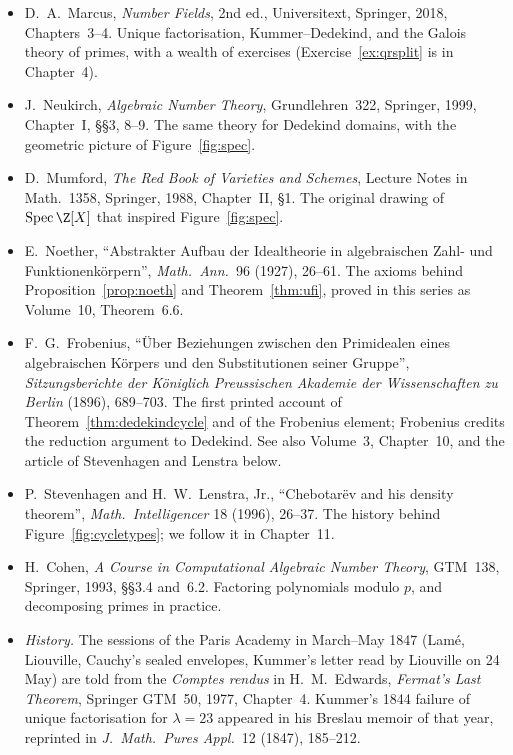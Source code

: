 \begin{itemize}
\item D.~A.~Marcus, \emph{Number Fields}, 2nd ed., Universitext, Springer, 2018, Chapters~3--4. Unique factorisation,
Kummer--Dedekind, and the Galois theory of primes, with a wealth of exercises (Exercise~\ref{ex:qrsplit} is in Chapter~4).
\item J.~Neukirch, \emph{Algebraic Number Theory}, Grundlehren~322, Springer, 1999, Chapter~I, \S\S3, 8--9. The same
theory for Dedekind domains, with the geometric picture of Figure~\ref{fig:spec}.
\item D.~Mumford, \emph{The Red Book of Varieties and Schemes}, Lecture Notes in Math.~1358, Springer, 1988, Chapter~II,
\S1. The original drawing of $\operatorname{Spec}\Z[X]$ that inspired Figure~\ref{fig:spec}.
\item E.~Noether, ``Abstrakter Aufbau der Idealtheorie in algebraischen Zahl- und Funktionenk\"orpern'',
\emph{Math.\ Ann.}\ 96 (1927), 26--61. The axioms behind Proposition~\ref{prop:noeth} and Theorem~\ref{thm:ufi}, proved
in this series as Volume~10, Theorem~6.6.
\item F.~G.~Frobenius, ``\"Uber Beziehungen zwischen den Primidealen eines algebraischen K\"orpers und den Substitutionen
seiner Gruppe'', \emph{Sitzungsberichte der K\"oniglich Preussischen Akademie der Wissenschaften zu Berlin} (1896),
689--703. The first printed account of Theorem~\ref{thm:dedekindcycle} and of the Frobenius element; Frobenius credits
the reduction argument to Dedekind. See also Volume~3, Chapter~10, and the article of Stevenhagen and Lenstra below.
\item P.~Stevenhagen and H.~W.~Lenstra, Jr., ``Chebotar\"ev and his density theorem'', \emph{Math.\ Intelligencer}
18 (1996), 26--37. The history behind Figure~\ref{fig:cycletypes}; we follow it in Chapter~11.
\item H.~Cohen, \emph{A Course in Computational Algebraic Number Theory}, GTM~138, Springer, 1993, \S\S3.4 and~6.2.
Factoring polynomials modulo $p$, and decomposing primes in practice.
\item \emph{History.} The sessions of the Paris Academy in March--May 1847 (Lam\'e, Liouville, Cauchy's sealed envelopes,
Kummer's letter read by Liouville on 24 May) are told from the \emph{Comptes rendus} in H.~M.~Edwards, \emph{Fermat's Last
Theorem}, Springer GTM~50, 1977, Chapter~4. Kummer's 1844 failure of unique factorisation for $\lambda=23$ appeared in his
Breslau memoir of that year, reprinted in \emph{J.\ Math.\ Pures Appl.}\ 12 (1847), 185--212.
\end{itemize}
